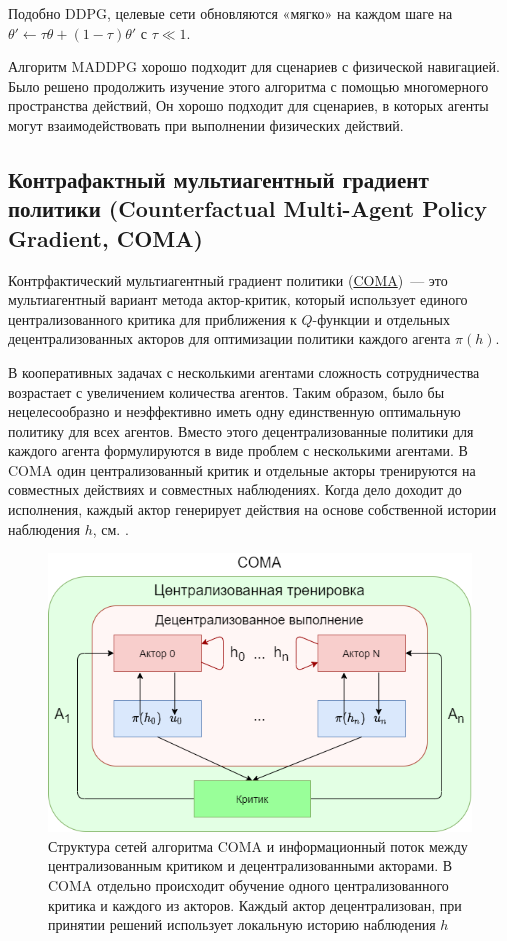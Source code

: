 Подобно DDPG, целевые сети обновляются «мягко» на каждом шаге на ${\theta' \leftarrow \tau \theta + (1 - \tau) \theta'}$ с $\tau \ll 1$.

Алгоритм MADDPG хорошо подходит для сценариев с физической навигацией. Было решено продолжить изучение этого алгоритма с помощью многомерного пространства действий, Он хорошо подходит для сценариев, в которых агенты могут взаимодействовать при выполнении физических действий.

\subsection{Контрафактный мультиагентный градиент политики (Counterfactual Multi-Agent Policy Gradient, COMA)}

Контрфактический мультиагентный градиент политики (\hyperref[acr:coma]{COMA})~--- это мультиагентный вариант метода актор-критик, который использует единого централизованного критика для приближения к $Q$-функции и отдельных децентрализованных акторов для оптимизации политики каждого агента $\pi (h)$. \cite{foerster2017counterfactual}

В кооперативных задачах с несколькими агентами сложность сотрудничества возрастает с увеличением количества агентов. Таким образом, было бы нецелесообразно и неэффективно иметь одну единственную оптимальную политику для всех агентов. Вместо этого децентрализованные политики для каждого агента формулируются в виде проблем с несколькими агентами. В COMA один централизованный критик и отдельные акторы тренируются на совместных действиях и совместных наблюдениях. Когда дело доходит до исполнения, каждый актор генерирует действия на основе собственной истории наблюдения $h$, см. .

\begin{figure}[ht!]
    \center
    \includegraphics [scale=0.80] {my_folder/images/ch2/coma.png}
    \caption{Структура сетей алгоритма COMA и информационный поток между централизованным критиком и децентрализованными акторами. В COMA отдельно происходит обучение одного централизованного критика и каждого из акторов. Каждый актор децентрализован, при принятии решений использует локальную историю наблюдения $h$ \cite{foerster2017counterfactual}}
    \label{fig:ch2-coma}
\end{figure}

